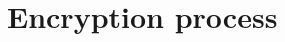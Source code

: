 \documentclass[report.tex]{subfiles}
\begin{document}
\section{Encryption process}
\label{sec:impl encryption process}
\end{document}

